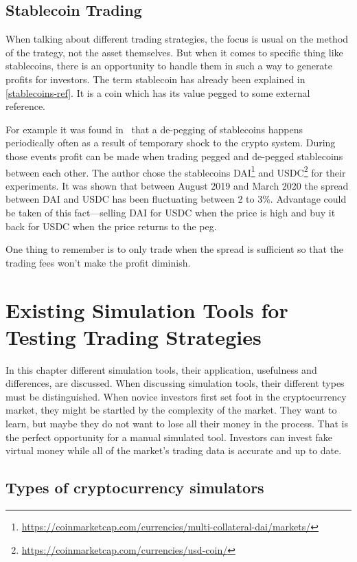 \section{Stablecoin Trading}

When talking about different trading strategies, the focus is usual on the method of the trategy, not the asset themselves. But when it comes to specific thing like stablecoins, there is an opportunity to handle them in such a way to generate profits for investors.
The term stablecoin has already been explained in \ref{stablecoins-ref}. It is a coin which has its value pegged to some external reference.

For example it was found in~\cite{make-money-stablecoins} that a de-pegging of stablecoins happens periodically often as a result of temporary shock to the crypto system. During those events profit can be made when trading pegged and de-pegged stablecoins between each other. The author chose the stablecoins DAI\footnote{\url{https://coinmarketcap.com/currencies/multi-collateral-dai/markets/}} and USDC\footnote{\url{https://coinmarketcap.com/currencies/usd-coin/}} for their experiments. It was shown that between August 2019 and March 2020 the spread between DAI and USDC has been fluctuating between 2 to 3\%. Advantage could be taken of this fact---selling DAI for USDC when the price is high and buy it back for USDC when the price returns to the peg.

One thing to remember is to only trade when the spread is sufficient so that the trading fees won't make the profit diminish.

\chapter{Existing Simulation Tools for Testing Trading Strategies}
\label{chapter-simulation-tools}

In this chapter different simulation tools, their application, usefulness and differences, are discussed. When discussing simulation tools, their different types must be distinguished. When novice investors first set foot in the cryptocurrency market, they might be startled by the complexity of the market. They want to learn, but maybe they do not want to lose all their money in the process. That is the perfect opportunity for a manual simulated tool. Investors can invest fake virtual money while all of the market's trading data is accurate and up to date.

\section*{Types of cryptocurrency simulators}

